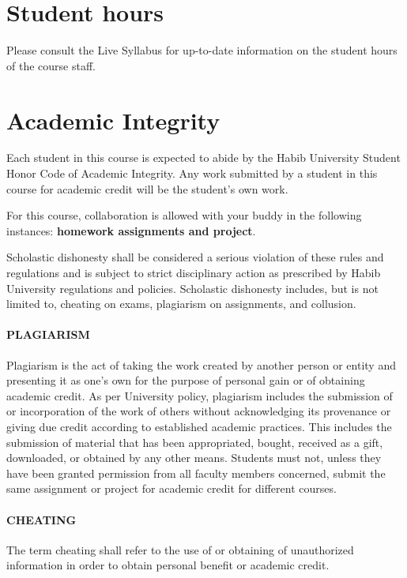 \documentclass[a4paper]{article}
\begin{document}

\section{Student hours}

Please consult the Live Syllabus for up-to-date information on the student hours of the course staff. 

\section{Academic Integrity}

Each student in this course is expected to abide by the Habib University Student Honor Code of Academic Integrity. Any work submitted by a student in this course for academic credit will be the student's own work. 

For this course, collaboration is allowed with your buddy in the following instances: \textbf{homework assignments and project}.

Scholastic dishonesty shall be considered a serious violation of these rules and regulations and is subject to strict disciplinary action as prescribed by Habib University regulations and policies. Scholastic dishonesty includes, but is not limited to, cheating on exams, plagiarism on assignments, and collusion. 

\paragraph{PLAGIARISM} Plagiarism is the act of taking the work created by another person or entity and presenting it as one’s own for the purpose of personal gain or of obtaining academic credit. As per University policy, plagiarism includes the submission of or incorporation of the work of others without acknowledging its provenance or giving due credit according to established academic practices. This includes the submission of material that has been appropriated, bought, received as a gift, downloaded, or obtained by any other means. Students must not, unless they have been granted permission from all faculty members concerned, submit the same assignment or project for academic credit for different courses. 

\paragraph{CHEATING} The term cheating shall refer to the use of or obtaining of unauthorized information in order to obtain personal benefit or academic credit. 
\end{document}
